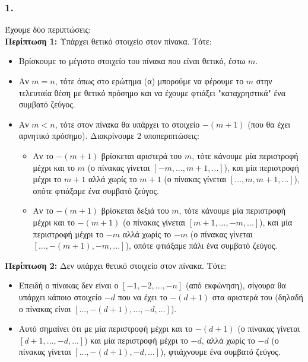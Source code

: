 			\subsubsection*{1.}
				Έχουμε δύο περιπτώσεις: \\
				\textbf{Περίπτωση 1:} Υπάρχει θετικό στοιχείο στον πίνακα. Τότε:
					\begin{itemize}
						\item Βρίσκουμε το μέγιστο στοιχείο του πίνακα που είναι θετικό, έστω $m$.
						\item Αν $m = n$, τότε όπως στο ερώτημα (α) μπορούμε να φέρουμε το $m$ στην τελευταία θέση με θετικό πρόσημο και να έχουμε φτιάξει "καταχρηστικά" ένα συμβατό ζεύγος.
						\item Αν $m < n$, τότε στον πίνακα θα υπάρχει το στοιχείο $-(m+1)$ (που θα έχει αρνητικό πρόσημο). Διακρίνουμε 2 υποπεριπτώσεις:
							\begin{itemize}
								\item Αν το $-(m+1)$ βρίσκεται αριστερά του $m$, τότε κάνουμε μία περιστροφή μέχρι και το $m$ (ο πίνακας γίνεται $[-m,...,m+1,...]$), και μία περιστροφή μέχρι το $m+1$ αλλά χωρίς το $m+1$ (ο πίνακας γίνεται $[...,m,m+1,...]$), οπότε φτιάξαμε ένα συμβατό ζεύγος.
								\item Αν το $-(m+1)$ βρίσκεται δεξιά του $m$, τότε κάνουμε μία περιστροφή μέχρι και το $-(m+1)$ (ο πίνακας γίνεται $[m+1,...,-m,...]$), και μία περιστροφή μέχρι το $-m$ αλλά χωρίς το $-m$ (ο πίνακας γίνεται $[...,-(m+1),-m,...]$), οπότε φτιάξαμε πάλι ένα συμβατό ζεύγος.
							\end{itemize}
					\end{itemize}
				\textbf{Περίπτωση 2:} Δεν υπάρχει θετικό στοιχείο στον πίνακα. Τότε:
					\begin{itemize}
						\item Επειδή ο πίνακας δεν είναι ο $[-1,-2,...,-n]$ (από εκφώνηση), σίγουρα θα υπάρχει κάποιο στοιχείο $-d$ που να έχει το $-(d+1)$ στα αριστερά του (δηλαδή ο πίνακας είναι ${[...,-(d+1),...,-d,...]}$).
						\item Αυτό σημαίνει ότι με μία περιστροφή μέχρι και το $-(d+1)$ (ο πίνακας γίνεται ${[d+1,...,-d,...]}$) και μία περιστροφή μέχρι το $-d$, αλλά χωρίς το $-d$ (ο πίνακας γίνεται ${[...,-(d+1),-d,...]}$), φτιάχνουμε ένα συμβατό ζεύγος.
					\end{itemize}
